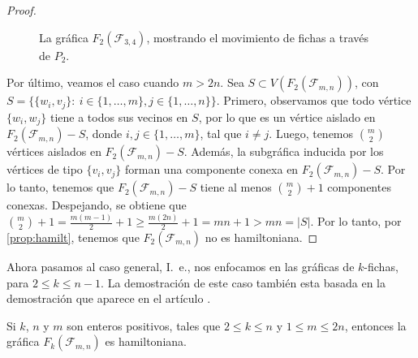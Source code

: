 \begin{proof}
\begin{figure}[ht!]
    
        \caption{La gr\'afica $F_2(\mathcal{F}_{3,4})$, mostrando el movimiento
        de fichas a trav\'es de $P_2$.}
    \label{fig:exe-tray-n-m}     
    \end{figure}

Por \'ultimo, veamos el caso cuando $m>2n$. Sea $S \subset
V(F_2(\mathcal{F}_{m,n}))$, con 
\linebreak
$S=\{\{w_i,v_j\} \colon\ i \in \{1,\dots,m\},j\in\{1,\dots,n\}\}$. Primero,
observamos que todo v\'ertice $\{w_i,w_j\}$ tiene a todos sus vecinos en $S$,
por lo que es un v\'ertice aislado en $F_2(\mathcal{F}_{m,n})-S$, donde $i,j \in
\{1,\dots,m\}$, tal que $i \neq j$. Luego, tenemos $\binom{m}{2}$ v\'ertices
aislados en $F_2(\mathcal{F}_{m,n})-S$. Adem\'as, la subgr\'afica inducida por
los v\'ertices de tipo $\{v_i,v_j\}$ forman una componente conexa en
$F_2(\mathcal{F}_{m,n})-S$. Por lo tanto, tenemos que $F_2(\mathcal{F}_{m,n})-S$
tiene al menos $\binom{m}{2} + 1$ componentes conexas. Despejando, se obtiene
que $\binom{m}{2} + 1 = \frac{m(m-1)}{2} + 1 \geq \frac{m(2n)}{2} + 1 = mn + 1 >
mn = |S|$. Por lo tanto, por \cref{prop:hamilt}, tenemos que
$F_2(\mathcal{F}_{m,n})$ no es hamiltoniana.

\end{proof}

Ahora pasamos al caso general, I.~e., nos enfocamos en las gr\'aficas de
$k$-fichas, para $2 \leq k \leq n-1$. La demostraci\'on de este caso tambi\'en
esta basada en la demostraci\'on que aparece en el art\'iculo
\cite{adameHamilt}.

\begin{teorema}
\label{teo:TokGenerFan}
    Si $k$, $n$ y $m$ son enteros positivos, tales que $2 \leq k \leq n$ y
    \linebreak
    $1 \leq m \leq 2n$, entonces la gr\'afica $F_k(\mathcal{F}_{m,n})$
    es hamiltoniana.
\end{teorema}

